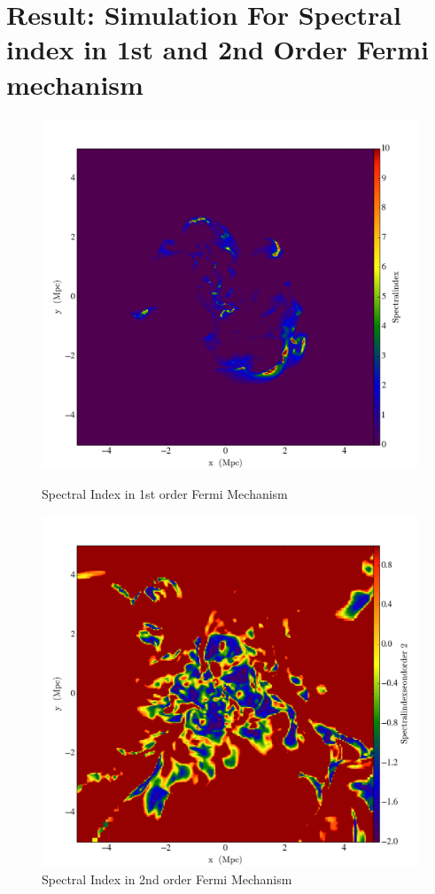 \documentclass[10pt]{article}
\begin{document}
\section{Result: Simulation For Spectral index in 1st and 2nd Order Fermi mechanism}
\begin{figure}[H] \label{fig} 
  \begin{minipage}[b]{0.5\linewidth}
    \includegraphics[width=.9\linewidth]{RedshiftOutput0033_Slice_z_SpectralIndex.png}
  \caption{Spectral Index in 1st order Fermi Mechanism} 
  \end{minipage} 
  \begin{minipage}[b]{0.5\linewidth}
    \includegraphics[width=.9\linewidth]{SpectralIndexSeondOrder_eta_2.png}
  \caption{Spectral Index in 2nd order Fermi Mechanism} 
  \end{minipage} 
  
\end{figure}
\end{document}
